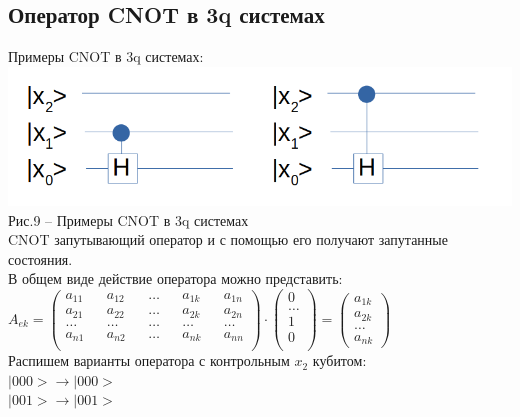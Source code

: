 \documentclass[11pt]{report}
\begin{document}
\subsection{Оператор CNOT в 3q системах}
Примеры CNOT в 3q системах: \\

\includegraphics[scale=0.3]{cnot_3}\\
Рис.9 -- Примеры CNOT в 3q системах \\

CNOT запутывающий оператор и с помощью его получают запутанные состояния. \\

В общем виде действие оператора можно представить:\\

$A_{ek} = \begin{pmatrix}
a_{11} && a_{12} && \dots && a_{1k} && a_{1n} \\
a_{21} && a_{22} && \dots && a_{2k} && a_{2n} \\
\dots && \dots && \dots && \dots && \dots \\
a_{n1} && a_{n2} && \dots && a_{nk} && a_{nn} \\
\end{pmatrix}\cdot \begin{pmatrix}
0  \\
\dots \\
1 \\
0 \\
 \end{pmatrix} = \begin{pmatrix}
 a_{1k} \\
 a_{2k} \\
 \dots \\
a_{nk}
 \end{pmatrix}$ \\

Распишем варианты оператора с контрольным $x_2$ кубитом: \\

$|000> \rightarrow |000>$ \\

$|001> \rightarrow |001>$ \\
\end{document}

